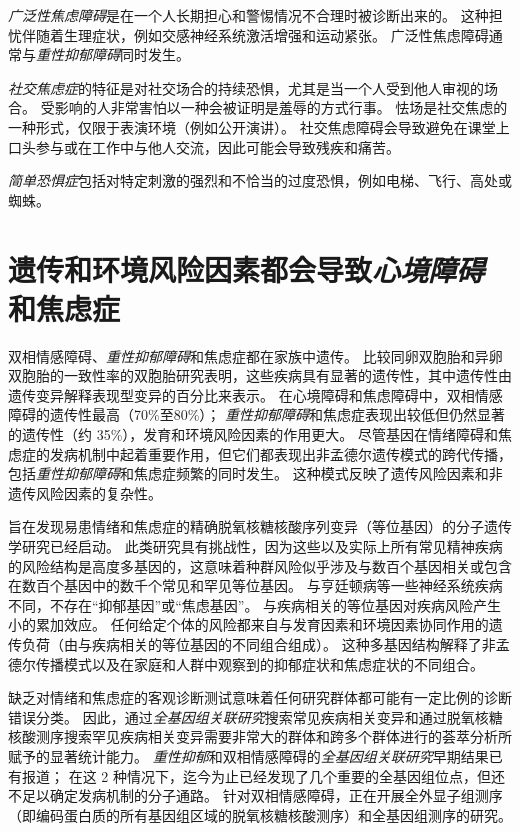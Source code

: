 \textit{广泛性焦虑障碍}是在一个人长期担心和警惕情况不合理时被诊断出来的。
这种担忧伴随着生理症状，例如交感神经系统激活增强和运动紧张。
广泛性焦虑障碍通常与\textit{重性抑郁障碍}同时发生。


\textit{社交焦虑症}的特征是对社交场合的持续恐惧，尤其是当一个人受到他人审视的场合。
受影响的人非常害怕以一种会被证明是羞辱的方式行事。
怯场是社交焦虑的一种形式，仅限于表演环境（例如公开演讲）。
社交焦虑障碍会导致避免在课堂上口头参与或在工作中与他人交流，因此可能会导致残疾和痛苦。



\textit{简单恐惧症}包括对特定刺激的强烈和不恰当的过度恐惧，例如电梯、飞行、高处或蜘蛛。



\section{遗传和环境风险因素都会导致\textit{心境障碍}和焦虑症}

双相情感障碍、\textit{重性抑郁障碍}和焦虑症都在家族中遗传。
比较同卵双胞胎和异卵双胞胎的一致性率的双胞胎研究表明，这些疾病具有显著的遗传性，其中遗传性由遗传变异解释表现型变异的百分比来表示。
在心境障碍和焦虑障碍中，双相情感障碍的遗传性最高（70\%至80\%）；
\textit{重性抑郁障碍}和焦虑症表现出较低但仍然显著的遗传性（约 35\%），发育和环境风险因素的作用更大。
尽管基因在情绪障碍和焦虑症的发病机制中起着重要作用，但它们都表现出非孟德尔遗传模式的跨代传播，包括\textit{重性抑郁障碍}和焦虑症频繁的同时发生。
这种模式反映了遗传风险因素和非遗传风险因素的复杂性。


旨在发现易患情绪和焦虑症的精确脱氧核糖核酸序列变异（等位基因）的分子遗传学研究已经启动。
此类研究具有挑战性，因为这些以及实际上所有常见精神疾病的风险结构是高度多基因的，这意味着种群风险似乎涉及与数百个基因相关或包含在数百个基因中的数千个常见和罕见等位基因。
与亨廷顿病等一些神经系统疾病不同，不存在“抑郁基因”或“焦虑基因”。
与疾病相关的等位基因对疾病风险产生小的累加效应。
任何给定个体的风险都来自与发育因素和环境因素协同作用的遗传负荷（由与疾病相关的等位基因的不同组合组成）。
这种多基因结构解释了非孟德尔传播模式以及在家庭和人群中观察到的抑郁症状和焦虑症状的不同组合。


缺乏对情绪和焦虑症的客观诊断测试意味着任何研究群体都可能有一定比例的诊断错误分类。
因此，通过\textit{全基因组关联研究}搜索常见疾病相关变异和通过脱氧核糖核酸测序搜索罕见疾病相关变异需要非常大的群体和跨多个群体进行的荟萃分析所赋予的显著统计能力。
\textit{重性抑郁}和双相情感障碍的\textit{全基因组关联研究}早期结果已有报道；
在这 2 种情况下，迄今为止已经发现了几个重要的全基因组位点，但还不足以确定发病机制的分子通路。
针对双相情感障碍，正在开展全外显子组测序（即编码蛋白质的所有基因组区域的脱氧核糖核酸测序）和全基因组测序的研究。


